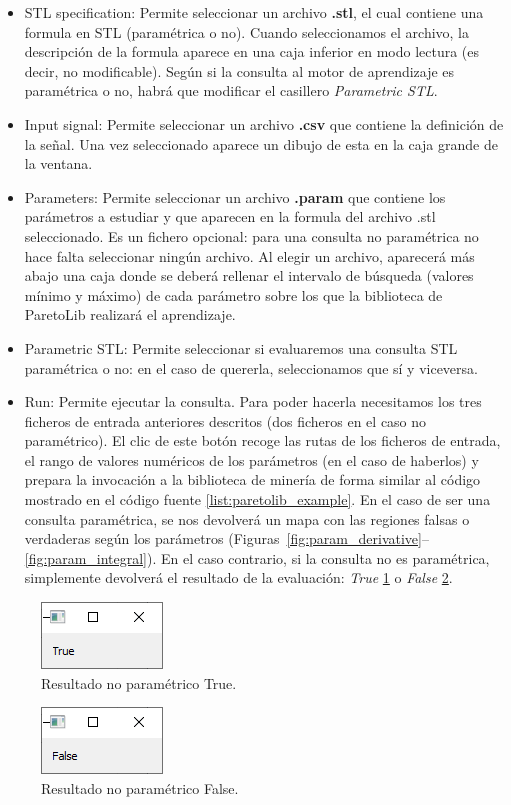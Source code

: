 \begin{itemize}
\item STL specification: Permite seleccionar un archivo \textbf{.stl}, el cual contiene una formula en STL (paramétrica o no). Cuando seleccionamos el archivo, la descripción de la formula aparece en una caja inferior en modo lectura (es decir, no modificable). Según si la consulta al motor de aprendizaje es paramétrica o no, habrá que modificar el casillero \textit{Parametric STL}.

\item Input signal: Permite seleccionar un archivo \textbf{.csv} que contiene la definición de la señal. Una vez seleccionado aparece un dibujo de esta en la caja grande de la ventana.

\item Parameters: Permite seleccionar un archivo \textbf{.param} que contiene los parámetros a estudiar y que aparecen en la formula del archivo .stl seleccionado. Es un fichero opcional: para una consulta no paramétrica no hace falta seleccionar ningún archivo. Al elegir un archivo, aparecerá más abajo una caja donde se deberá rellenar el intervalo de búsqueda (valores mínimo y máximo) de cada parámetro sobre los que la biblioteca de ParetoLib realizará el aprendizaje.

\item Parametric STL: Permite seleccionar si evaluaremos una consulta STL paramétrica o no: en el caso de quererla, seleccionamos que sí y viceversa.

\item Run: Permite ejecutar la consulta. Para poder hacerla necesitamos los tres ficheros de entrada anteriores descritos (dos ficheros en el caso no paramétrico). El clic de este botón recoge las rutas de los ficheros de entrada, el rango de valores numéricos de los parámetros (en el caso de haberlos) y prepara la invocación a la biblioteca de minería de forma similar al código mostrado en el código fuente \ref{list:paretolib_example}. En el caso de ser una consulta paramétrica, se nos devolverá un mapa con las regiones falsas o verdaderas según los parámetros (Figuras~\ref{fig:param_derivative}--\ref{fig:param_integral}). En el caso contrario, si la consulta no es paramétrica, simplemente devolverá el resultado de la evaluación: \textit{True} \ref{fig:noparam_true} o \textit{False} \ref{fig:noparam_false}.
\end{itemize}

\begin{figure}[htb]
\centering
  \includegraphics[width=0.3\linewidth]{images/stl_noparam_true} 
\caption{Resultado no paramétrico True.}
\label{fig:noparam_true}
\end{figure}

\begin{figure}[htb]
\centering
  \includegraphics[width=0.3\linewidth]{images/stl_noparam_false} 
\caption{Resultado no paramétrico False.}
\label{fig:noparam_false}
\end{figure}
